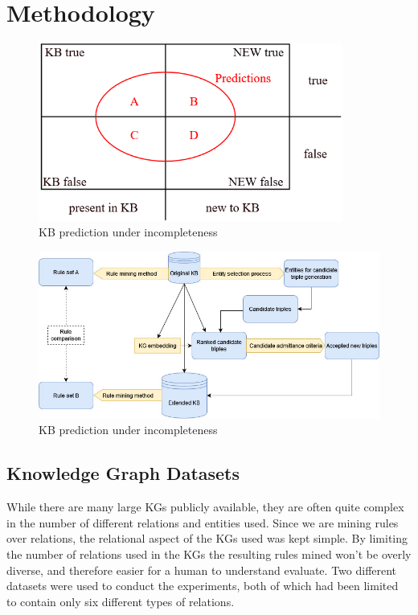 \chapter{Methodology}

\begin{figure}[htp]
    \centering
    \includegraphics[width=10cm]{figures/kb_venn.png}
    \caption{KB prediction under incompleteness}
\end{figure}

\begin{figure}[htp]
    \centering
    \includegraphics[width=12cm]{figures/ontology_mining_pipeline.jpg}
    \caption{KB prediction under incompleteness}
\end{figure}


\section{Knowledge Graph Datasets}
While there are many large KGs publicly available, they are often quite complex in the number of different relations and entities used. Since we are mining rules over relations, the relational aspect of the KGs used was kept simple. By limiting the number of relations used in the KGs the resulting rules mined won't be overly diverse, and therefore easier for a human to understand evaluate. Two different datasets were used to conduct the experiments, both of which had been limited to contain only six different types of relations.


